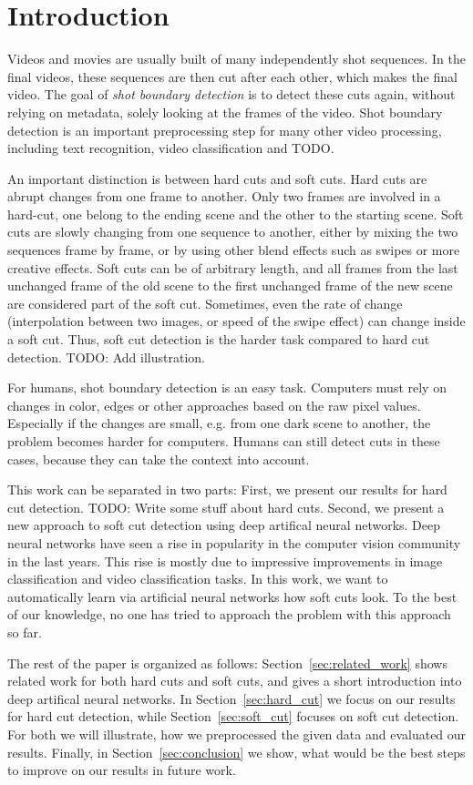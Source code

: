 \section{Introduction}
\label{sec:introduction}

Videos and movies are usually built of many independently shot sequences.
In the final videos, these sequences are then cut after each other, which makes the final video.
The goal of \emph{shot boundary detection} is to detect these cuts again, without relying on metadata, solely looking at the frames of the video.
Shot boundary detection is an important preprocessing step for many other video processing, including text recognition, video classification and TODO.

An important distinction is between hard cuts and soft cuts.
Hard cuts are abrupt changes from one frame to another.
Only two frames are involved in a hard-cut, one belong to the ending scene and the other to the starting scene.
Soft cuts are slowly changing from one sequence to another, either by mixing the two sequences frame by frame, or by using other blend effects such as swipes or more creative effects.
Soft cuts can be of arbitrary length, and all frames from the last unchanged frame of the old scene to the first unchanged frame of the new scene are considered part of the soft cut.
Sometimes, even the rate of change (interpolation between two images, or speed of the swipe effect) can change inside a soft cut.
Thus, soft cut detection is the harder task compared to hard cut detection.
TODO: Add illustration.

For humans, shot boundary detection is an easy task.
Computers must rely on changes in color, edges or other approaches based on the raw pixel values.
Especially if the changes are small, e.g. from one dark scene to another, the problem becomes harder for computers.
Humans can still detect cuts in these cases, because they can take the context into account.

This work can be separated in two parts:
First, we present our results for hard cut detection.
TODO: Write some stuff about hard cuts.
Second, we present a new approach to soft cut detection using deep artifical neural networks.
Deep neural networks have seen a rise in popularity in the computer vision community in the last years.
This rise is mostly due to impressive improvements in image classification and video classification tasks.
In this work, we want to automatically learn via artificial neural networks how soft cuts look.
To the best of our knowledge, no one has tried to approach the problem with this approach so far.

The rest of the paper is organized as follows:
Section~\ref{sec:related_work} shows related work for both hard cuts and soft cuts, and gives a short introduction into deep artifical neural networks.
In Section~\ref{sec:hard_cut} we focus on our results for hard cut detection, while Section~\ref{sec:soft_cut} focuses on soft cut detection.
For both we will illustrate, how we preprocessed the given data and evaluated our results.
Finally, in Section~\ref{sec:conclusion} we show, what would be the best steps to improve on our results in future work.
